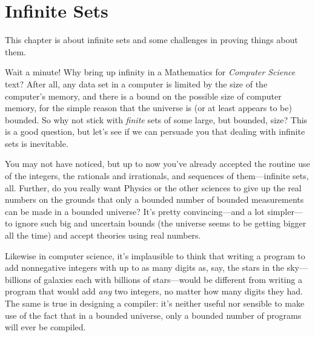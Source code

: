 \newcommand{\nohalt}{\text{\small{No-halt}}}
\newcommand{\asciibet}{\text{ASCII}}
\newcommand{\asciistr}{\strings{\asciibet}}

\chapter{Infinite Sets}\label{infinite_chap}\label{set_theory_chap}

This chapter is about infinite sets%
%
and some challenges in proving things about them.

Wait a minute!  Why bring up infinity in a Mathematics for
\emph{Computer Science} text?  After all, any data set in a computer
is limited by the size of the computer's memory, and there is a bound
on the possible size of computer memory, for the simple reason that
the universe is (or at least appears to be) bounded.  So why not stick
with \emph{finite} sets of some large, but bounded, size?  This
is a good question, but let's see if we can persuade you that dealing
with infinite sets is inevitable.

\iffalse We've run into a lot of computer science students who wonder
why they should care about infinite sets.  They point out that
\fi

You may not have noticed, but up to now you've already accepted the
routine use of the integers, the rationals and irrationals, and
sequences of them---infinite sets, all.  Further, do you really want
Physics or the other sciences to give up the real numbers on the
grounds that only a bounded number of bounded measurements can be made
in a bounded universe?  It's pretty convincing---and a lot
simpler---to ignore such big and uncertain bounds (the universe seems
to be getting bigger all the time) and accept theories using real
numbers.

Likewise in computer science, it's implausible to think that writing a
program to add nonnegative integers with up to as many digits as, say,
the stars in the sky---billions of galaxies each with billions of
stars---would be different from writing a program that would add
\emph{any} two integers, no matter how many digits they had.  The same
is true in designing a compiler: it's neither useful nor sensible to
make use of the fact that in a bounded universe, only a bounded number
of programs will ever be compiled.

